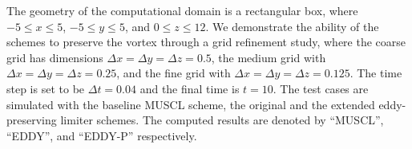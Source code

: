 The geometry of the computational domain is a rectangular box, where $-5\le x \le5$, $-5\le y \le 5$, and $0\le z \le 12$. We demonstrate the ability of the schemes to preserve the vortex through a grid refinement study, where the coarse grid has dimensions $\Delta x=\Delta y=\Delta z=0.5$, the medium grid with $\Delta x=\Delta y=\Delta z=0.25$, and the fine grid with $\Delta x=\Delta y=\Delta z=0.125$. The time step is set to be $\Delta t=0.04$ and the final time is $t=10$. The test cases are simulated with the baseline MUSCL scheme, the original and the extended eddy-preserving limiter schemes. The computed results are denoted by ``MUSCL'', ``EDDY'', and ``EDDY-P'' respectively.
\begin{figure}[t]
\centering

\end{figure}
